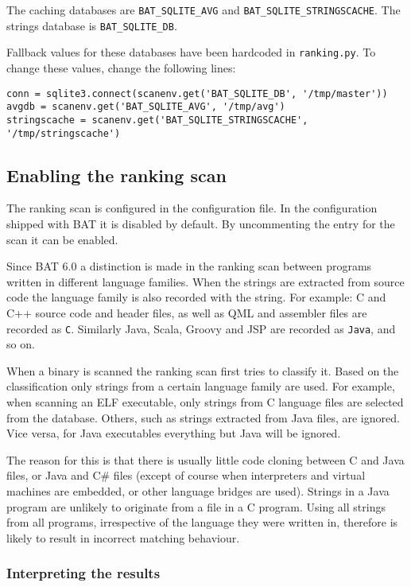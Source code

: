 \documentclass[10pt]{article}
\begin{document}
The caching databases are \texttt{BAT\_SQLITE\_AVG} and
\texttt{BAT\_SQLITE\_STRINGSCACHE}. The strings database is \texttt{BAT\_SQLITE\_DB}.

Fallback values for these databases have been hardcoded in \texttt{ranking.py}.
To change these values, change the following lines:

\begin{verbatim}
conn = sqlite3.connect(scanenv.get('BAT_SQLITE_DB', '/tmp/master'))
avgdb = scanenv.get('BAT_SQLITE_AVG', '/tmp/avg')
stringscache = scanenv.get('BAT_SQLITE_STRINGSCACHE', '/tmp/stringscache')
\end{verbatim}

\subsection{Enabling the ranking scan}

The ranking scan is configured in the configuration file. In the configuration
shipped with BAT it is disabled by default. By uncommenting the entry for
the scan it can be enabled.

Since BAT 6.0 a distinction is made in the ranking scan between programs
written in different language families. When the strings are extracted from
source code the language family is also recorded with the string. For example:
C and C++ source code and header files, as well as QML and assembler files are
recorded as \texttt{C}. Similarly Java, Scala, Groovy and JSP are recorded as
\texttt{Java}, and so on.

When a binary is scanned the ranking scan first tries to classify it. Based on
the classification only strings from a certain language family are used. For
example, when scanning an ELF executable, only strings from C language files
are selected from the database. Others, such as strings extracted from Java
files, are ignored. Vice versa, for Java executables everything but Java will
be ignored.  

The reason for this is that there is usually little code cloning between C and
Java files, or Java and C\# files (except of course when interpreters and
virtual machines are embedded, or other language bridges are used). Strings in
a Java program are unlikely to originate from a file in a C program. Using all
strings from all programs, irrespective of the language they were written in,
therefore is likely to result in incorrect matching behaviour.

\subsubsection{Interpreting the results}
\end{document}
